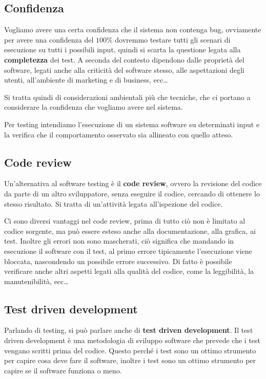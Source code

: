 \subsection{Confidenza}
Vogliamo avere una certa confidenza che il sistema non contenga bug, ovviamente per
avere una confidenza del $100\%$ dovremmo testare tutti gli scenari di esecuzione su 
tutti i possibili input, quindi si scarta la questione legata alla \textbf{completezza}
dei test.
A seconda del contesto dipendono dalle proprietà del software, legati anche 
alla criticità del software stesso, alle aspettazioni degli utenti, all'ambiente 
di marketing e di business, ecc\dots

Si tratta quindi di considerazioni ambientali più che tecniche, che ci portano a
considerare la confidenza che vogliamo avere nel sistema.

\begin{tcolorbox}[title={Testing}]
   Per testing intendiamo l'esecuzione di un sistema software su determinati input
   e la verifica che il comportamento osservato sia allineato con quello atteso.
\end{tcolorbox}
\subsection{Code review}
Un'alternativa al software testing è il \textbf{code review}, ovvero la revisione del codice
da parte di un altro sviluppatore, senza eseguire il codice, cercando di ottenere 
lo stesso risultato. Si tratta di un'attività legata all'ispezione del codice.

Ci sono diversi vantaggi nel code review, prima di tutto ciò non è limitato al codice
sorgente, ma può essere esteso anche alla documentazione, alla grafica, ai test.
Inoltre gli errori non sono mascherati, ciò significa che mandando in esecuzione il software 
con il test, al primo errore tipicamente l'esecuzione viene bloccata, nascondendo 
un possibile errore successivo.
Di fatto è possibile verificare anche altri aspetti legati alla qualità del codice,
come la leggibilità, la manutenibilità, ecc\dots
\subsection{Test driven development}
Parlando di testing, si può parlare anche di \textbf{test driven development}.
Il test driven development è una metodologia di sviluppo software che prevede
che i test vengano scritti prima del codice. Questo perché i test sono un
ottimo strumento per capire cosa deve fare il software, inoltre i test sono
un ottimo strumento per capire se il software funziona o meno.

